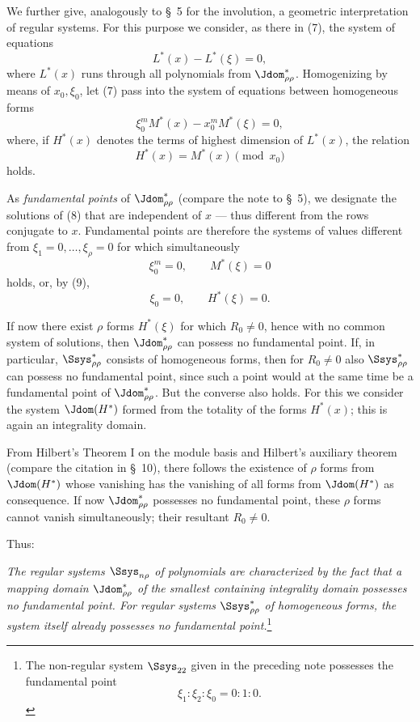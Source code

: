 \documentclass[11pt]{article}
\begin{document}
We further give, analogously to \S\ 5 for the involution, a geometric interpretation of regular systems. For this purpose we consider, as there in (7), the system of equations
\begin{equation}
  L^*(x)-L^*(\xi)=0,
\tag{7}
\end{equation}
where $L^*(x)$ runs through all polynomials from $\Jdom^*_{\rho\rho}$. Homogenizing by means of $x_0,
\xi_0$, let (7) pass into the system of equations between homogeneous forms
\begin{equation}
  \xi_0^{m}M^*(x)-x_0^{m}M^*(\xi)=0,
\tag{8}
\end{equation}
where, if $H^*(x)$ denotes the terms of highest dimension of $L^*(x)$, the relation
\begin{equation}
  H^*(x)=M^*(x)\pmod{x_0}
\tag{9}
\end{equation}
holds.

As \emph{fundamental points} of $\Jdom^*_{\rho\rho}$ (compare the note to \S\ 5), we designate the solutions of (8) that are independent of $x$ --- thus different from the rows conjugate to $x$. Fundamental points are therefore the systems of values different from $\xi_1=0,
\ldots,
\xi_\rho=0$ for which simultaneously
\[
  \xi_0^m=0,
  \qquad M^*(\xi)=0
\]
holds, or, by (9),
\[
  \xi_0=0,
  \qquad H^*(\xi)=0.
\]

If now there exist $\rho$ forms $H^*(\xi)$ for which $R_0\ne0$, hence with no common system of solutions, then $\Jdom^*_{\rho\rho}$ can possess no fundamental point. If, in particular, $\Ssys^*_{\rho\rho}$ consists of homogeneous forms, then for $R_0\ne0$ also $\Ssys^*_{\rho\rho}$ can possess no fundamental point, since such a point would at the same time be a fundamental point of $\Jdom^*_{\rho\rho}$. But the converse also holds. For this we consider the system $\Jdom(H^*)$ formed from the totality of the forms $H^*(x)$; this is again an integrality domain.

From Hilbert's Theorem I on the module basis and Hilbert's auxiliary theorem (compare the citation in \S\ 10), there follows the existence of $\rho$ forms from $\Jdom(H^*)$ whose vanishing has the vanishing of all forms from $\Jdom(H^*)$ as consequence. If now $\Jdom^*_{\rho\rho}$ possesses no fundamental point, these $\rho$ forms cannot vanish simultaneously; their resultant $R_0\ne0$.

Thus:

\emph{The regular systems $\Ssys_{n\rho}$ of polynomials are characterized by the fact that a mapping domain $\Jdom^*_{\rho\rho}$ of the smallest containing integrality domain possesses no fundamental point. For regular systems $\Ssys^*_{\rho\rho}$ of homogeneous forms, the system itself already possesses no fundamental point.}\footnote{The non-regular system $\Ssys_{22}$ given in the preceding note possesses the fundamental point
\[
  \xi_1:\xi_2:\xi_0=0:1:0.
\]}
\end{document}
